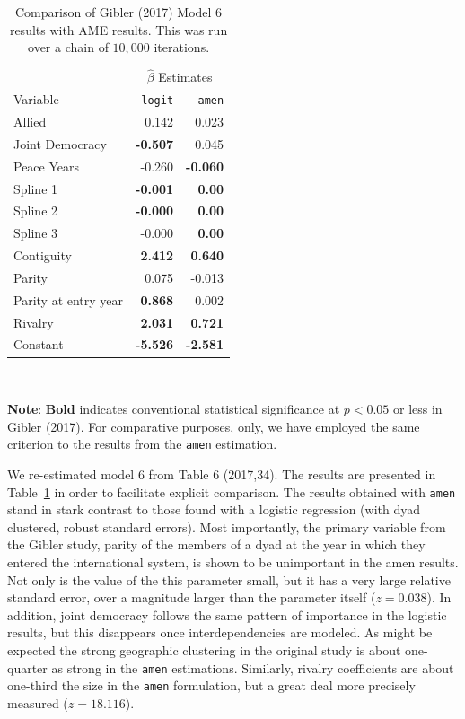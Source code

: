 \documentclass[12pt]{amsart}
\begin{document}
\begin{table}
\begin{center}
\caption{Comparison of Gibler (2017) Model 6 results with AME results. This was run over a chain of $10,000$ iterations.  \label{tab:gibme}}
\begin{tabular}{lrr} \toprule
& \multicolumn{2}{c}{$\hat{\beta}$ Estimates}\\ \cmidrule{2-3}
Variable & \texttt{logit} & \texttt{amen} \\ \midrule
Allied & 0.142&  0.023 \\
Joint Democracy &\bf -0.507&  0.045 \\
Peace Years \bf &-0.260& \bf -0.060 \\
Spline 1 &\bf -0.001& \bf 0.00 \\
Spline 2&\bf -0.000& \bf 0.00\\
Spline 3 &-0.000& \bf 0.00\\ 
Contiguity &\bf 2.412& \bf 0.640 \\
Parity &0.075&  -0.013 \\
Parity at entry year&\bf 0.868&  0.002 \\ 
Rivalry &\bf 2.031&\bf 0.721\\ 
Constant &\bf -5.526 & \bf  -2.581\\ \bottomrule
\end{tabular}\\
\end{center}
{\bf Note}: {\bf Bold} indicates conventional statistical significance at $p < 0.05$ or less in Gibler (2017). For comparative purposes, only, we have employed the same criterion to the results from the \texttt{amen} estimation.
\end{table}

We re-estimated model 6 from Table 6 (2017,34). The results are presented in Table~\ref{tab:gibme} in order to facilitate explicit comparison.
The results obtained with \texttt{amen} stand in stark contrast to those found with a logistic regression (with dyad clustered, robust standard errors).  Most importantly, the primary variable from the Gibler study, parity of the members of a dyad at the year in which they entered the international system, is shown to be unimportant in the amen results.  Not only is the value of the this parameter small, but it has a very large relative standard error, over a magnitude larger than the parameter itself ($z= 0.038$). In addition, joint democracy follows the same pattern of importance in the logistic results, but this disappears once interdependencies are modeled.  As might be expected the strong geographic clustering in the original study is about one-quarter as strong in the \texttt{amen} estimations. Similarly, rivalry coefficients are about one-third the size in the \texttt{amen} formulation, but a great deal more precisely measured ($z=18.116$). 
\end{document}
